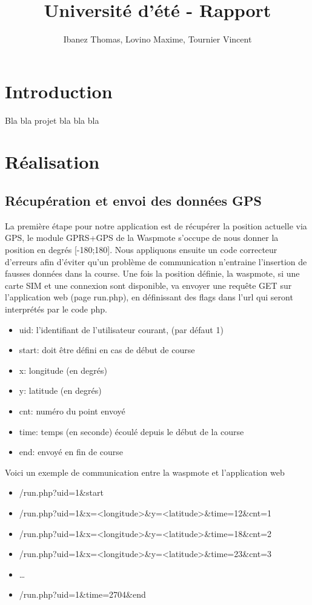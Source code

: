\documentclass[a4paper,11pt]{article}
\title{Université d'été - Rapport}
\author{Ibanez Thomas, Lovino Maxime, Tournier Vincent}
\begin{document}
\maketitle
\section{Introduction}
Bla bla projet bla bla bla
\section{Réalisation}
\subsection{Récupération et envoi des données GPS}
La première étape pour notre application est de récupérer la position actuelle via GPS, le module GPRS+GPS de la Waspmote s'occupe de nous donner la position en degrés [-180;180].\newline
Nous appliquons ensuite un code correcteur d'erreurs afin d'éviter qu'un problème de communication n'entraine l'insertion de fausses données dans la course.\newline
Une fois la position définie, la waspmote, si une carte SIM et une connexion sont disponible, va envoyer une requête GET sur l'application web (page run.php), en définissant des flags dans l'url qui seront interprétés par le code php.
\begin{itemize}
\item uid: l'identifiant de l'utilisateur courant, (par défaut 1)
\item start: doit être défini en cas de début de course
\item x: longitude (en degrés)
\item y: latitude (en degrés)
\item cnt: numéro du point envoyé
\item time: temps (en seconde) écoulé depuis le début de la course
\item end: envoyé en fin de course
\end{itemize}
Voici un exemple de communication entre la waspmote et l'application web
\begin{itemize}
\item /run.php?uid=1\&start
\item /run.php?uid=1\&x=<longitude>\&y=<latitude>\&time=12\&cnt=1
\item /run.php?uid=1\&x=<longitude>\&y=<latitude>\&time=18\&cnt=2
\item /run.php?uid=1\&x=<longitude>\&y=<latitude>\&time=23\&cnt=3
\item \ldots
\item /run.php?uid=1\&time=2704\&end
\end{itemize}
\end{document}
